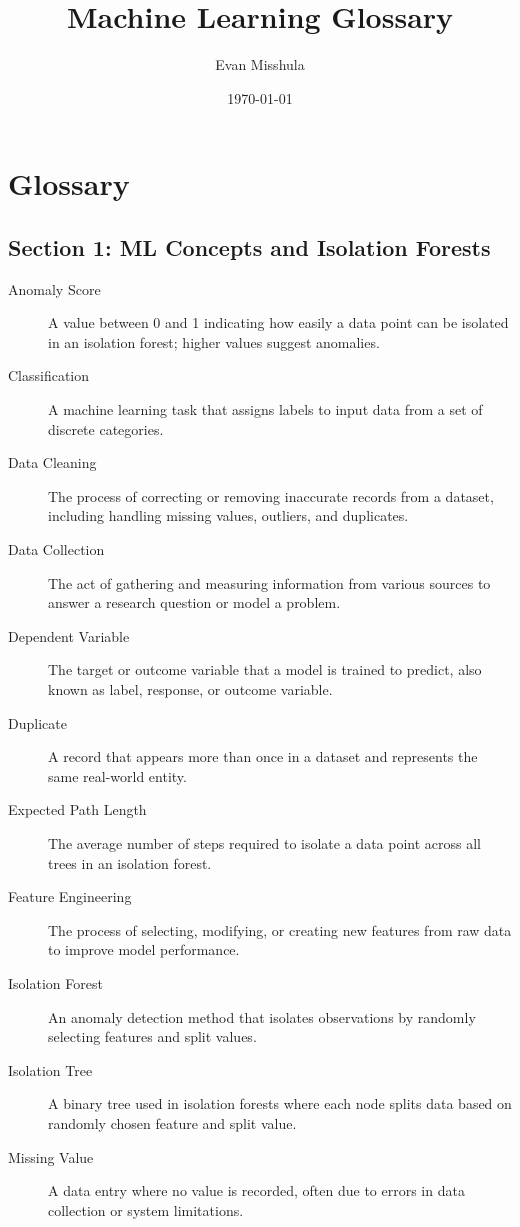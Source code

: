 \documentclass[11pt]{article}
\author{Evan Misshula}
\date{\today}
\title{Machine Learning Glossary}
\begin{document}
\maketitle

\section{Glossary}
\label{sec:orgd8867bf}

\subsection{Section 1: ML Concepts and Isolation Forests}
\label{sec:orgbd7edd6}
\begin{description}
\item[{Anomaly Score}] A value between 0 and 1 indicating how easily a data point can be isolated in an isolation forest; higher values suggest anomalies.
\item[{Classification}] A machine learning task that assigns labels to input data from a set of discrete categories.
\item[{Data Cleaning}] The process of correcting or removing inaccurate records from a dataset, including handling missing values, outliers, and duplicates.
\item[{Data Collection}] The act of gathering and measuring information from various sources to answer a research question or model a problem.
\item[{Dependent Variable}] The target or outcome variable that a model is trained to predict, also known as label, response, or outcome variable.
\item[{Duplicate}] A record that appears more than once in a dataset and represents the same real-world entity.
\item[{Expected Path Length}] The average number of steps required to isolate a data point across all trees in an isolation forest.
\item[{Feature Engineering}] The process of selecting, modifying, or creating new features from raw data to improve model performance.
\item[{Isolation Forest}] An anomaly detection method that isolates observations by randomly selecting features and split values.
\item[{Isolation Tree}] A binary tree used in isolation forests where each node splits data based on randomly chosen feature and split value.
\item[{Missing Value}] A data entry where no value is recorded, often due to errors in data collection or system limitations.

\end{description}
\end{document}
